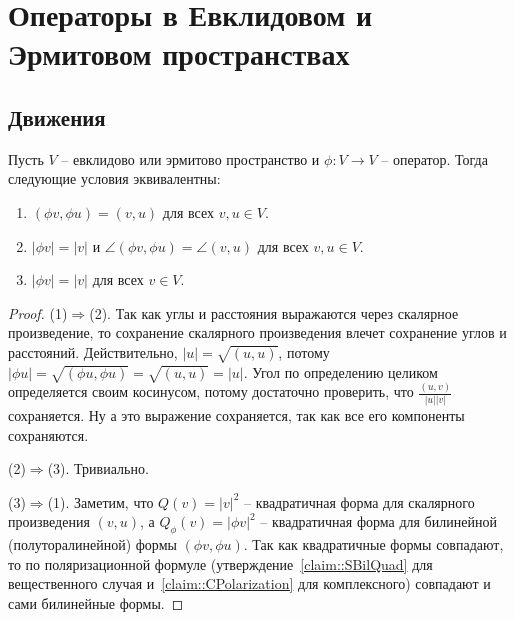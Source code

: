 \newpage
\section{Операторы в Евклидовом и Эрмитовом пространствах}

\subsection{Движения}

\begin{claim}
Пусть $V$ -- евклидово или эрмитово пространство и $\phi\colon V\to V$ -- оператор. Тогда следующие условия эквивалентны:
\begin{enumerate}
\item $(\phi v, \phi u) = (v, u)$ для всех $v, u\in V$.
\item $|\phi v| = |v|$ и $\angle(\phi v, \phi u) = \angle(v, u)$ для всех $v, u\in V$.
\item $|\phi v| = |v|$ для всех $v\in V$.
\end{enumerate}
\end{claim}
\begin{proof}
(1)$\Rightarrow$(2). Так как углы и расстояния выражаются через скалярное произведение, то сохранение скалярного произведения влечет сохранение углов и расстояний. Действительно, $|u| = \sqrt{(u,u)}$, потому $|\phi u| = \sqrt{(\phi u, \phi u)} = \sqrt{(u,u)}= |u|$. Угол по определению целиком определяется своим косинусом, потому достаточно проверить, что $\frac{(u,v)}{|u| |v|}$ сохраняется. Ну а это выражение сохраняется, так как все его компоненты сохраняются.


(2)$\Rightarrow$(3). Тривиально.

(3)$\Rightarrow$(1). Заметим, что $Q(v) = |v|^2$ -- квадратичная форма для скалярного произведения $(v,u)$, а $Q_\phi(v) = |\phi v|^2$ -- квадратичная форма для билинейной (полуторалинейной) формы $(\phi v, \phi u)$. Так как квадратичные формы совпадают, то по поляризационной формуле (утверждение~\ref{claim::SBilQuad} для вещественного случая и~\ref{claim::CPolarization} для комплексного) совпадают и сами билинейные формы.
\end{proof}

